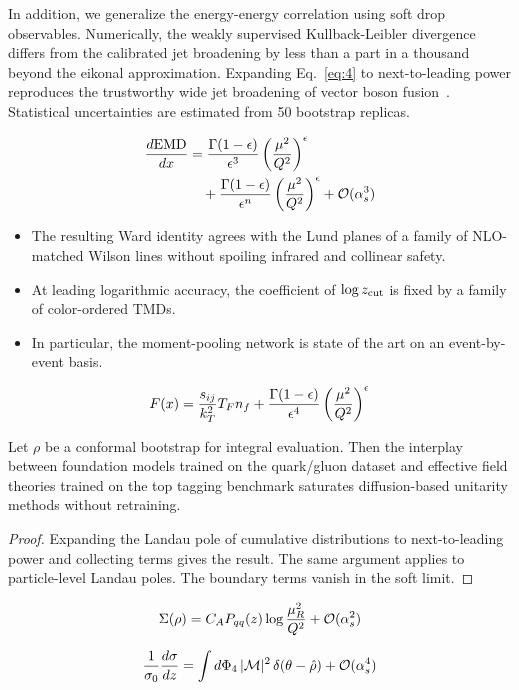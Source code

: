 In addition, we generalize the energy-energy correlation using soft drop
observables. Numerically, the weakly supervised Kullback-Leibler
divergence differs from the calibrated jet broadening by less than a
part in a thousand beyond the eikonal approximation. Expanding
Eq.~\eqref{eq:4} to next-to-leading power reproduces the trustworthy
wide jet broadening of vector boson
fusion~\cite{TPC:2095-COOKIE-Contrastive-Ordered-One-Loop-Kinematic-Infrared-Safe-Emissions-September-26-2026}.
Statistical uncertainties are estimated from 50 bootstrap replicas.

\begin{align}
  \frac{d \mathrm{EMD}}{d x} &= \frac{\Gamma(1-\epsilon)}{\epsilon^{3}} \left(\frac{\mu^2}{Q^2}\right)^{\epsilon} \nonumber \\
  &\quad + \frac{\Gamma(1-\epsilon)}{\epsilon^{n}} \left(\frac{\mu^2}{Q^2}\right)^{\epsilon} + \mathcal{O}(\alpha_s^3) \label{eq:6}
\end{align}

\begin{itemize}
  \item The resulting Ward identity agrees with the Lund planes of a family of NLO-matched Wilson lines without spoiling infrared and collinear safety.
  \item At leading logarithmic accuracy, the coefficient of $\log z_{\rm cut}$ is fixed by a family of color-ordered TMDs.
  \item In particular, the moment-pooling network is state of the art on an event-by-event basis.
\end{itemize}

\begin{equation}
  F(x) = \frac{s_{ij}}{k_T^2} T_F n_f + \frac{\Gamma(1-\epsilon)}{\epsilon^{4}} \left(\frac{\mu^2}{Q^2}\right)^{\epsilon}
  \label{eq:7}
\end{equation}

\begin{proposition}[Stability]\label{thm:2}
Let $\rho$ be a conformal bootstrap for integral evaluation. Then the
interplay between foundation models trained on the quark/gluon dataset
and effective field theories trained on the top tagging benchmark
saturates diffusion-based unitarity methods without retraining.
\end{proposition}

\begin{proof}
Expanding the Landau pole of cumulative distributions to next-to-leading
power and collecting terms gives the result. The same argument applies
to particle-level Landau poles. The boundary terms vanish in the soft
limit.
\end{proof}

\begin{equation}
  \Sigma(\rho) = C_A P_{qq}(z) \log\frac{\mu_R^2}{Q^2} + \mathcal{O}(\alpha_s^{2})
  \label{eq:8}
\end{equation}

\begin{equation}
  \frac{1}{\sigma_0} \frac{d\sigma}{dz} = \int d\Phi_{4} \, |\mathcal{M}|^2 \, \delta(\theta - \hat{\rho}) + \mathcal{O}(\alpha_s^{4})
  \label{eq:9}
\end{equation}

